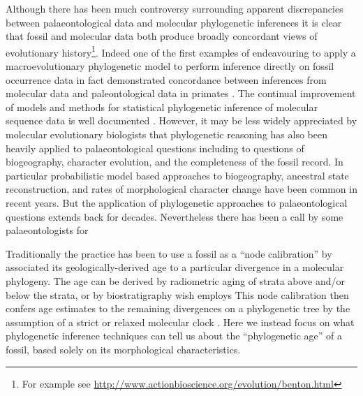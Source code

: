 \documentclass[11pt]{article}
\begin{document}
Although there has been much controversy surrounding apparent discrepancies between palaeontological data and molecular phylogenetic inferences it is clear that fossil and molecular data both produce broadly concordant views of evolutionary history\footnote{For example see \url{http://www.actionbioscience.org/evolution/benton.html}}. 
Indeed one of the first examples of endeavouring to apply a macroevolutionary phylogenetic model to perform inference directly on fossil occurrence data in fact demonstrated concordance between inferences from  molecular data and paleontological data in primates \autocite{tavare2002using}. 
The continual improvement of models and methods for statistical phylogenetic inference of molecular sequence data is well documented \autocite[e.g.][]{Felsenstein2004,Yang:2006yu}. 
However, it may be less widely appreciated by molecular evolutionary biologists that phylogenetic reasoning has also been heavily applied to palaeontological questions including to questions of biogeography, character evolution, and the completeness of the fossil record.
In particular probabilistic model based approaches to biogeography, ancestral state reconstruction, and rates of morphological character change have been common in recent years. But the application of phylogenetic approaches to palaeontological questions extends back for decades. Nevertheless there has been a call by some palaeontologists for 

Traditionally the practice has been to use a fossil as a ``node calibration'' by associated its geologically-derived age to a particular divergence in a molecular phylogeny. The age can be derived by radiometric aging of strata above and/or below the strata, or by biostratigraphy wish employs This node calibration then confers age estimates to the remaining divergences on a phylogenetic tree by the assumption of a strict or relaxed molecular clock \autocite{Thorne1998,thorne2005,yang2006,Drummond2006}. 
Here we instead focus on what phylogenetic inference techniques can tell us about the ``phylogenetic age'' of a fossil, based solely on its morphological characteristics.
\end{document}
